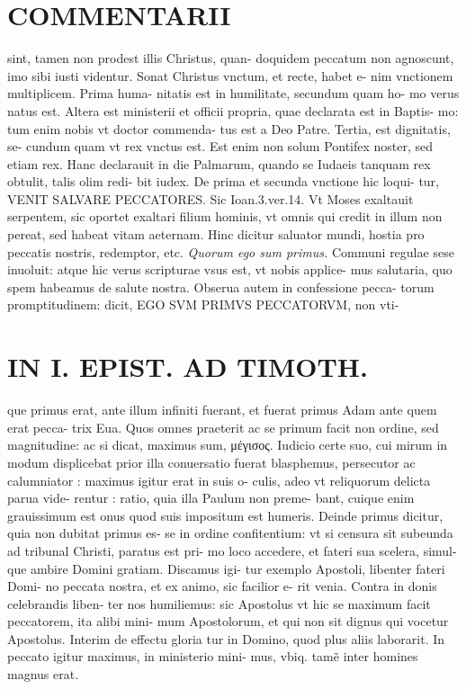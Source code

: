 \documentclass{article}
\begin{document}
\begin{pages}
\section*{COMMENTARII }
\marginpar{[ p.34 ]}\pstart sint, tamen non prodest illis Christus, quan- doquidem peccatum non agnoscunt, imo sibi iusti videntur.  \pend\pstart Sonat Christus vnctum, et recte, habet e- nim vnctionem multiplicem. Prima huma- nitatis est in humilitate, secundum quam ho- mo verus natus est. Altera est ministerii et officii propria, quae declarata est in Baptis- mo: tum enim nobis vt doctor commenda- tus est a Deo Patre. Tertia, est dignitatis, se- cundum quam vt rex vnctus est. Est enim non solum Pontifex noster, sed etiam rex. Hanc declarauit in die Palmarum, quando se Iudaeis tanquam rex obtulit, talis olim redi- bit iudex.  \pend\pstart De prima et secunda vnctione hic loqui- tur, VENIT SALVARE PECCATORES. Sic Ioan.3.ver.14. Vt Moses exaltauit serpentem, sic oportet exaltari filium hominis, vt omnis qui credit in illum non pereat, sed habeat vitam aeternam. Hinc dicitur saluator mundi, hostia pro peccatis nostris, redemptor, etc.  \pend
\textit{Quorum ego sum primus. }\pstart Communi regulae sese inuoluit: atque hic verus scripturae vsus est, vt nobis applice- mus salutaria, quo spem habeamus de salute nostra. Obserua autem in confessione pecca- torum promptitudinem: dicit, EGO SVM PRIMVS PECCATORVM, non vti-  \pend
\section*{IN I. EPIST. AD TIMOTH. }
\marginpar{[ p.35 ]}\pstart que primus erat, ante illum infiniti fuerant, et fuerat primus Adam ante quem erat pecca- trix Eua. Quos omnes praeterit ac se primum facit non ordine, sed magnitudine: ac si dicat, maximus sum, μέγισος. Iudicio certe suo, cui mirum in modum displicebat prior illa conuersatio fuerat blasphemus, persecutor ac calumniator : maximus igitur erat in suis o- culis, adeo vt reliquorum delicta parua vide- rentur : ratio, quia illa Paulum non preme- bant, cuique enim grauissimum est onus quod suis impositum est humeris. Deinde primus dicitur, quia non dubitat primus es- se in ordine confitentium: vt si censura sit subeunda ad tribunal Christi, paratus est pri- mo loco accedere, et fateri sua scelera, simul- que ambire Domini gratiam. Discamus igi- tur exemplo Apostoli, libenter fateri Domi- no peccata nostra, et ex animo, sic facilior e- rit venia. Contra in donis celebrandis liben- ter nos humiliemus: sic Apostolus vt hic se maximum facit peccatorem, ita alibi mini- mum Apostolorum, et qui non sit dignus qui vocetur Apostolus. Interim de effectu gloria tur in Domino, quod plus aliis laborarit. In peccato igitur maximus, in ministerio mini- mus, vbiq. tamẽ inter homines magnus erat.  \pend
\marginpar{[ p.36 ]}

\end{pages}
\end{document}
